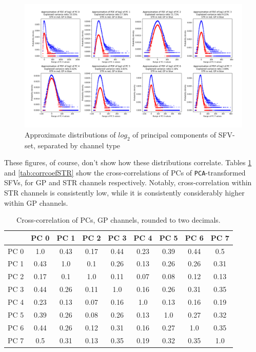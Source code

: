 \documentclass{article}
\begin{document}
\begin{figure}[H]
    \centering
    \centerline{\includegraphics[width=1\textwidth]{images/PCA/PCABOTHLG2.png}}
    \caption{Approximate distributions of \begin{math}log_2\end{math} of principal components of SFV-set, separated by channel type}
    \label{fig:PCAPDFBOTHLG2}
\end{figure}

These figures, of course, don't show how these distributions correlate.
Tables \ref{tab:corrcoefGP} and \ref{tab:corrcoefSTR} show the cross-correlations of PCs of \texttt{PCA}-transformed SFVs, for GP and STR channels respectively.
Notably, cross-correlation within STR channels is consistently low, while it is consistently considerably higher within GP channels.

\begin{table}[H]
    \centering
    \begin{tabular}{|c|c|c|c|c|c|c|c|c|}
    \hline
          & PC 0 & PC 1 & PC 2 & PC 3  & PC 4 & PC 5 & PC 6 & PC 7 \\ \hline
     PC 0 & 1.0  & 0.43 & 0.17 & 0.44  & 0.23 & 0.39 & 0.44 & 0.5  \\ \hline
     PC 1 & 0.43 & 1.0  & 0.1  & 0.26  & 0.13 & 0.26 & 0.26 & 0.31 \\ \hline
     PC 2 & 0.17 & 0.1  & 1.0  & 0.11  & 0.07 & 0.08 & 0.12 & 0.13 \\ \hline
     PC 3 & 0.44 & 0.26 & 0.11 & 1.0   & 0.16 & 0.26 & 0.31 & 0.35 \\ \hline
     PC 4 & 0.23 & 0.13 & 0.07 & 0.16  & 1.0  & 0.13 & 0.16 & 0.19 \\ \hline
     PC 5 & 0.39 & 0.26 & 0.08 & 0.26  & 0.13 & 1.0  & 0.27 & 0.32 \\ \hline
     PC 6 & 0.44 & 0.26 & 0.12 & 0.31  & 0.16 & 0.27 & 1.0  & 0.35 \\ \hline
     PC 7 & 0.5  & 0.31 & 0.13 & 0.35  & 0.19 & 0.32 & 0.35 & 1.0  \\ \hline
    \end{tabular}
    \caption{Cross-correlation of PCs, GP channels, rounded to two decimals.}
    \label{tab:corrcoefGP}
\end{table}
\end{document}
